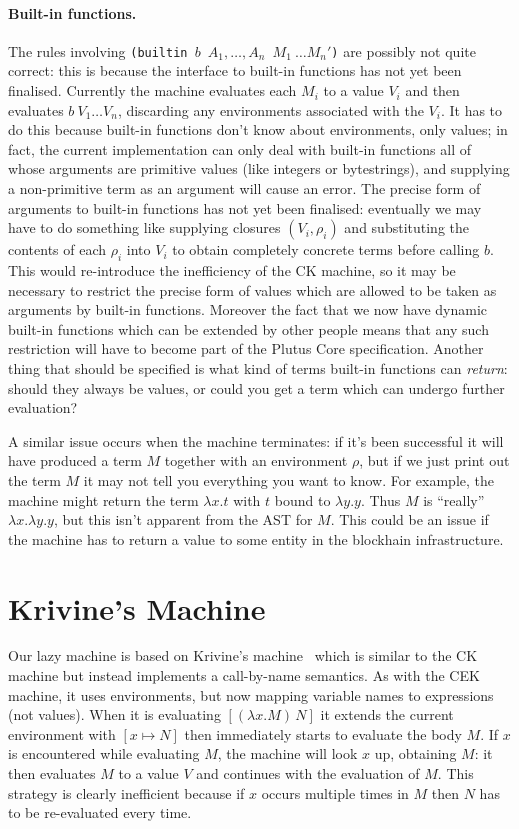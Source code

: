 \documentclass[a4paper]{article}
\begin{document}
\paragraph{Built-in functions.} The rules involving \texttt{(builtin $b$\ $A_1, \ldots, A_n$
  $M_1\ \ldots M_n'$)} are possibly not quite correct: this is because
the interface to built-in functions has not yet been finalised.
Currently the machine evaluates each $M_i$ to a value $V_i$ and then
evaluates $b\ V_1 \ldots V_n$, discarding any environments associated
with the $V_i$.  It has to do this because built-in functions don't
know about environments, only values; in fact, the current
implementation can only deal with built-in functions all of whose
arguments are primitive values (like integers or bytestrings), and
supplying a non-primitive term as an argument will cause an error.
The precise form of arguments to built-in functions has not yet been
finalised: eventually we may have to do something like supplying
closures $(V_i, \rho_i)$ and substituting the contents of each
$\rho_i$ into $V_i$ to obtain completely concrete terms before calling
$b$.  This would re-introduce the inefficiency of the CK machine, so
it may be necessary to restrict the precise form of values which are
allowed to be taken as arguments by built-in functions. Moreover the
fact that we now have dynamic built-in functions which can be extended
by other people means that any such restriction will have to become
part of the Plutus Core specification.  Another thing that should be
specified is what kind of terms built-in functions can
\textit{return}: should they always be values, or could you get a term
which can undergo further evaluation?

A similar issue occurs when the machine terminates: if it's been
successful it will have produced a term $M$ together with an
environment $\rho$, but if we just print out the term $M$ it may not
tell you everything you want to know.  For example, the machine might
return the term $\lambda x.t$ with $t$ bound to $\lambda y.y$.  Thus
$M$ is ``really'' $\lambda x.\lambda y.y$, but this isn't apparent
from the AST for $M$.  This could be an issue if the machine has to
return a value to some entity in the blockhain infrastructure.  




\section{Krivine's Machine}
Our lazy machine is based on Krivine's machine~\cite{Krivine} which is
similar to the CK machine but instead implements a call-by-name
semantics.  As with the CEK machine, it uses environments, but now
mapping variable names to expressions (not values).  When it is
evaluating $[(\lambda x.M)\, N]$ it extends the current environment with
$[x \mapsto N]$ then immediately starts to evaluate the body $M$.  If
$x$ is encountered while evaluating $M$, the machine will look $x$ up,
obtaining $M$: it then evaluates $M$ to a value $V$ and continues with
the evaluation of $M$.  This strategy is clearly inefficient because
if $x$ occurs multiple times in $M$ then $N$ has to be re-evaluated
every time.
\end{document}

